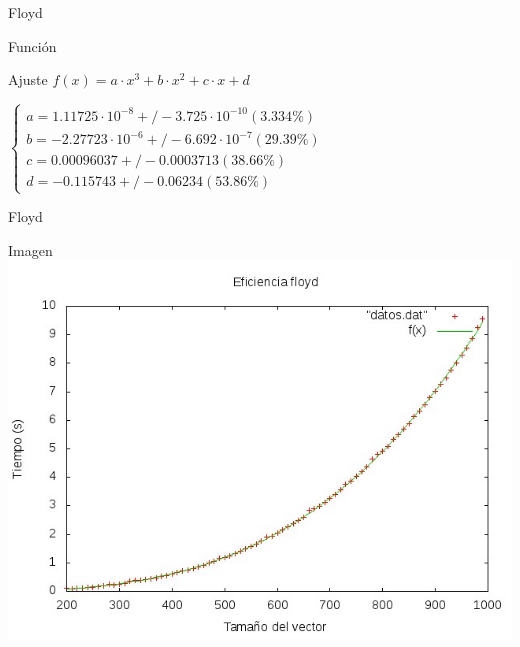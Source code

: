 \documentclass[compress]{beamer}
\begin{document}


\begin{frame}{Floyd}
	\begin{block}{Función}
	
	\end{block}
	
	\begin{block}{Ajuste}
	$f(x) = a\cdot x^3 + b\cdot x^2 + c\cdot x + d $

	$\left\{ \begin{array}{c}
	a               = 1.11725\cdot 10^{-8}      +/- 3.725\cdot 10^{-10}    (3.334\%) \\
	b               = -2.27723\cdot 10^{-6}     +/- 6.692\cdot 10^{-7}    (29.39\%) \\
	c               = 0.00096037       +/- 0.0003713    (38.66\%) \\
	d               = -0.115743        +/- 0.06234      (53.86\%)
	\end{array}\right.$
	\end{block}
\end{frame}

\begin{frame}{Floyd}
	\begin{alertblock}{Imagen}
	\includegraphics[scale=0.55]{../Graficas/Floyd/floydO0_ruben.jpeg}
	\end{alertblock}
\end{frame}
\end{document}
